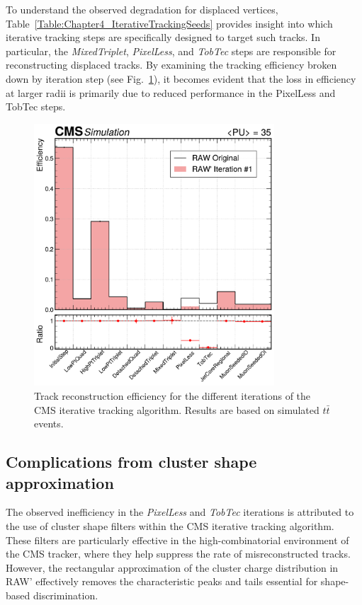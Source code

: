 To understand the observed degradation for displaced vertices, Table~\ref{Table:Chapter4_IterativeTrackingSeeds} provides insight into which iterative tracking steps are specifically designed to target such tracks. In particular, the \textit{MixedTriplet}, \textit{PixelLess}, and \textit{TobTec} steps are responsible for reconstructing displaced tracks. By examining the tracking efficiency broken down by iteration step (see Fig.~\ref{Figure:Chapter5_TrackingPerformance_bystep}), it becomes evident that the loss in efficiency at larger radii is primarily due to reduced performance in the PixelLess and TobTec steps.

\begin{figure}[!htbp]
\centering
\includegraphics[width=0.8\textwidth]{Figures/Chapter5/efficiency_with_ratio.pdf}
\caption[Track reconstruction efficiency for the different iterations of the CMS iterative tracking algorithm.]{Track reconstruction efficiency for the different iterations of the \ac{CMS} iterative tracking algorithm. Results are based on simulated $t\bar{t}$ events.}
\label{Figure:Chapter5_TrackingPerformance_bystep}
\end{figure}

\subsection{Complications from cluster shape approximation}

The observed inefficiency in the \textit{PixelLess} and \textit{TobTec} iterations is attributed to the use of cluster shape filters within the \ac{CMS} iterative tracking algorithm. These filters are particularly effective in the high-combinatorial environment of the \ac{CMS} tracker, where they help suppress the rate of misreconstructed tracks. However, the rectangular approximation of the cluster charge distribution in RAW' effectively removes the characteristic peaks and tails essential for shape-based discrimination.


